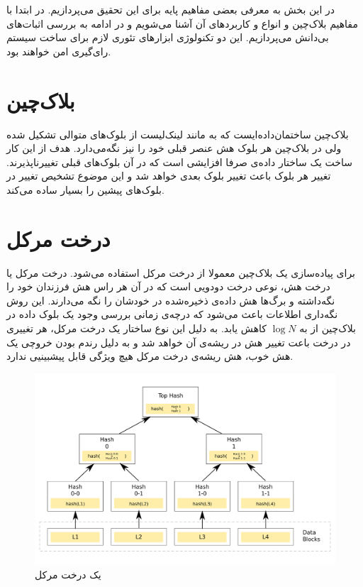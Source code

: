 در این بخش به معرفی بعضی مفاهیم پایه برای این تحقیق می‌پردازیم. در ابتدا با مفاهیم بلاک‌چین و انواع و کاربرد‌های آن آشنا می‌شویم و در ادامه به بررسی اثبات‌های بی‌دانش می‌پردازیم. این دو تکنولوژی ابزارهای تئوری لازم برای ساخت سیستم رای‌گیری امن خواهند بود.
\section{بلاک‌چین}
بلاک‌چین ساختمان‌داده‌ایست که به مانند لینک‌‌لیست
از بلوک‌‌های متوالی تشکیل شده ولی در بلاک‌چین هر بلوک هش
عنصر قبلی خود را نیز نگه‌می‌دارد. هدف از این کار ساخت یک ساختار داده‌ی صرفا افزایشی 
است که در آن‌ بلوک‌های قبلی تغییرناپذیرند. تغییر هر بلوک باعث تغییر بلوک بعدی خواهد شد و این موضوع تشخیص تغییر در بلوک‌های پیشین را بسیار ساده می‌کند.
\section{درخت مرکل}


برای پیاده‌سازی یک بلاک‌چین معمولا از درخت مرکل
 استفاده‌ می‌شود. درخت مرکل یا درخت هش، نوعی درخت دودویی 
 است که در آن هر راس هش فرزندان خود را نگه‌داشته و برگ‌ها هش داده‌ی ذخیره‌شده در خودشان را نگه می‌دارند. این روش نگه‌داری اطلاعات باعث می‌شود که درچه‌ی زمانی بررسی وجود یک بلوک داده در بلاک‌چین از 
 به 
$ \log N$
 کاهش یابد. به دلیل این نوع ساختار یک درخت مرکل، هر تغییری در درخت باعت تغییر هش در ریشه‌ی آن خواهد شد و به دلیل رندم بودن خروچی یک هش خوب، هش ریشه‌ی درخت مرکل هیچ ویژگی قابل پیشبینیی ندارد.
 
 \begin{figure}[th!]
 	\centering
 	\includegraphics[width=.7\linewidth]{Hash_Tree.png}
 	\caption {یک درخت مرکل}
 	\label{fig:merkle}
 \end{figure}
 
